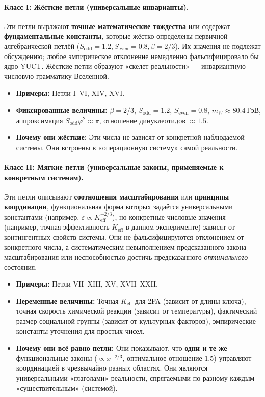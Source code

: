 \documentclass[12pt,a4paper]{article}
\begin{document}
	\paragraph{Класс I: Жёсткие петли (универсальные инварианты).}
	Эти петли выражают \textbf{точные математические тождества} или содержат \textbf{фундаментальные константы}, которые жёстко определены первичной алгебраической петлёй (\(S_{\mathrm{odd}}=1.2, S_{\mathrm{even}}=0.8, \beta=2/3\)). Их значения не подлежат обсуждению; любое эмпирическое отклонение немедленно фальсифицировало бы ядро YUCT. Жёсткие петли образуют «скелет реальности» — инвариантную числовую грамматику Вселенной.
	\begin{itemize}
		\item \textbf{Примеры:} Петли I--VI, XIV, XVI.
		\item \textbf{Фиксированные величины:} \(\beta = 2/3\), \(S_{\mathrm{odd}}=1.2\), \(S_{\mathrm{even}}=0.8\), \(m_W \approx 80.4\ \text{ГэВ}\), аппроксимация \(S_{\mathrm{odd}}\varphi^2 \approx \pi\), отношение динуклеотидов \(\approx 1.5\).
		\item \textbf{Почему они жёсткие:} Эти числа не зависят от конкретной наблюдаемой системы. Они встроены в «операционную систему» самой реальности.
	\end{itemize}
	
	\paragraph{Класс II: Мягкие петли (универсальные законы, применяемые к конкретным системам).}
	Эти петли описывают \textbf{соотношения масштабирования} или \textbf{принципы координации}, функциональная форма которых задаётся универсальными константами (например, \(\varepsilon \propto K_{\mathrm{eff}}^{-2/3}\)), но конкретные числовые значения (например, точная эффективность \(K_{\mathrm{eff}}\) в данном эксперименте) зависят от контингентных свойств системы. Они не фальсифицируются отклонением от конкретного числа, а систематическим невыполнением предсказанного закона масштабирования или неспособностью достичь предсказанного \textit{оптимального} состояния.
	\begin{itemize}
		\item \textbf{Примеры:} Петли VII--XIII, XV, XVII--XXII.
		\item \textbf{Переменные величины:} Точная \(K_{\mathrm{eff}}\) для 2FA (зависит от длины ключа), точная скорость химической реакции (зависит от температуры), фактический размер социальной группы (зависит от культурных факторов), эмпирические константы уточнения для простых чисел.
		\item \textbf{Почему они всё равно петли:} Они показывают, что \textbf{одни и те же} функциональные законы (\(\propto x^{-2/3}\), оптимальное отношение \(1.5\)) управляют координацией в чрезвычайно разных областях. Они являются универсальными «глаголами» реальности, спрягаемыми по-разному каждым «существительным» (системой).
	\end{itemize}
	
\end{document}

